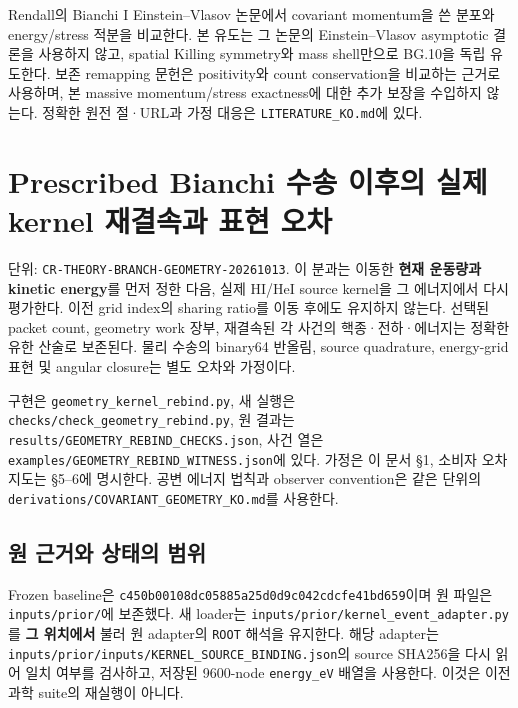 \documentclass[11pt,a4paper]{article}
\begin{document}
Rendall의 Bianchi I Einstein--Vlasov 논문에서 covariant momentum을 쓴 분포와 energy/stress 적분을 비교한다. 본 유도는 그 논문의 Einstein--Vlasov asymptotic 결론을 사용하지 않고, spatial Killing symmetry와 mass shell만으로 BG.10을 독립 유도한다. 보존 remapping 문헌은 positivity와 count conservation을 비교하는 근거로 사용하며, 본 massive momentum/stress exactness에 대한 추가 보장을 수입하지 않는다. 정확한 원전 절·URL과 가정 대응은 \texttt{LITERATURE\_KO.md}에 있다.

\clearpage

\hypertarget{prescribed-bianchi-uxc218uxc1a1-uxc774uxd6c4uxc758-uxc2e4uxc81c-kernel-uxc7acuxacb0uxc18duxacfc-uxd45cuxd604-uxc624uxcc28}{%
\section{Prescribed Bianchi 수송 이후의 실제 kernel 재결속과 표현 오차}\label{prescribed-bianchi-uxc218uxc1a1-uxc774uxd6c4uxc758-uxc2e4uxc81c-kernel-uxc7acuxacb0uxc18duxacfc-uxd45cuxd604-uxc624uxcc28}}

단위: \nolinkurl{CR-THEORY-BRANCH-GEOMETRY-20261013}. 이 분과는 이동한 \textbf{현재 운동량과 kinetic energy}를 먼저 정한 다음, 실제 HI/HeI source kernel을 그 에너지에서 다시 평가한다. 이전 grid index의 sharing ratio를 이동 후에도 유지하지 않는다. 선택된 packet count, geometry work 장부, 재결속된 각 사건의 핵종·전하·에너지는 정확한 유한 산술로 보존된다. 물리 수송의 binary64 반올림, source quadrature, energy-grid 표현 및 angular closure는 별도 오차와 가정이다.

구현은 \texttt{geometry\_kernel\_rebind.py}, 새 실행은 \nolinkurl{checks/check_geometry_rebind.py}, 원 결과는 \nolinkurl{results/GEOMETRY_REBIND_CHECKS.json}, 사건 열은 \nolinkurl{examples/GEOMETRY_REBIND_WITNESS.json}에 있다. 가정은 이 문서 §1, 소비자 오차 지도는 §5--6에 명시한다. 공변 에너지 법칙과 observer convention은 같은 단위의 \nolinkurl{derivations/COVARIANT_GEOMETRY_KO.md}를 사용한다.

\hypertarget{uxc6d0-uxadfcuxac70uxc640-uxc0c1uxd0dcuxc758-uxbc94uxc704}{%
\subsection{원 근거와 상태의 범위}\label{uxc6d0-uxadfcuxac70uxc640-uxc0c1uxd0dcuxc758-uxbc94uxc704}}

Frozen baseline은 \nolinkurl{c450b00108dc05885a25d0d9c042cdcfe41bd659}이며 원 파일은 \texttt{inputs/prior/}에 보존했다. 새 loader는 \nolinkurl{inputs/prior/kernel_event_adapter.py}를 \textbf{그 위치에서} 불러 원 adapter의 \texttt{ROOT} 해석을 유지한다. 해당 adapter는 \nolinkurl{inputs/prior/inputs/KERNEL_SOURCE_BINDING.json}의 source SHA256을 다시 읽어 일치 여부를 검사하고, 저장된 9600-node \texttt{energy\_eV} 배열을 사용한다. 이것은 이전 과학 suite의 재실행이 아니다.
\end{document}
